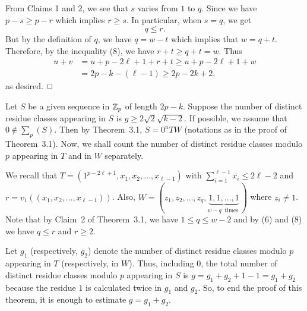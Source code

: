 \documentclass[fleqn]{mat01}
\begin{document}
\begin{pot}
{From Claims 1 and 2, we see that $s$ varies from $1$ to $q$. Since we
have $p -s \geq p-r$ which implies $r\geq s$. In particular, when $s = q$,
we get
\begin{equation}
q\leq r.
\end{equation}
But by the definition of $q$, we have $q = w-t$ which implies that $w =
q+t$. Therefore, by the inequality (8), we have $r+t \geq q+t= w$. Thus
\begin{align*}
u+v &= u+p -2\ell+1+r+t\geq u+p-2\ell+1+w\\[.3pc]
&= 2p -k-(\ell-1)\geq 2p -2k+2,
\end{align*}
as desired.} $\hfill\Box$
\end{pot}

\begin{pot}{\rm Let $S$ be a given sequence in ${\Bbb Z}_p$ of length $2p-k$.
Suppose the number of distinct residue classes appearing in $S$ is
$g\geq 2\sqrt{2}\sqrt{k-2}$. If possible, we assume that $0\not\in
\sum_p(S)$. Then by Theorem~3.1, $S = 0^u T W$ (notations as in the
proof of Theorem~3.1). Now, we shall count the number of distinct
residue classes modulo $p$ appearing in $T$ and in $W$ separately.

We recall that $T = (1^{p-2\ell+1}, x_1,x_2,\ldots, x_{\ell-1})$ with
$\sum_{i=1}^{\ell-1} \overline{x_i}\leq 2\ell-2$ and $r =
v_1((x_1,x_2,\ldots,x_{\ell-1}))$. Also, $W = (z_1, z_2, \ldots, z_q,
\underbrace{1, 1, \ldots, 1}_{w-q \ \mbox{ times }})$ where $z_i\ne 1$.
Note that by Claim~2 of Theorem~3.1, we have $1\leq q\leq w-2$ and by
(6) and (8) we have $q\leq r$ and $r\geq 2$.

Let $g_1$ (respectively, $g_2$) denote the number of distinct residue
classes modulo $p$ appearing in $T$ (respectively, in $W$). Thus,
including $0$, the total number of distinct residue classes modulo $p$
appearing in $S$ is $g=g_1+g_2+1-1 = g_1+g_2$ because the residue $1$ is
calculated twice in $g_1$ and $g_2$. So, to end the proof of this
theorem, it is enough to estimate $g=g_1+g_2$.

}
\end{pot}
\end{document}
